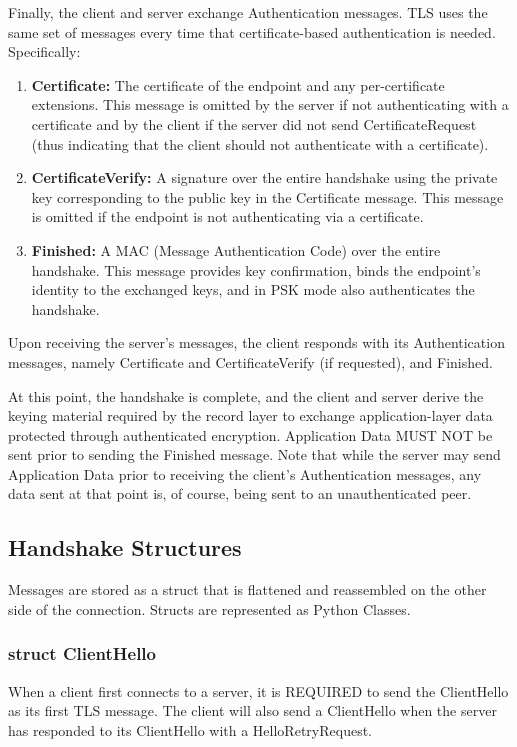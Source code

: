 \documentclass{article}
\begin{document}
   Finally, the client and server exchange Authentication messages.  TLS
   uses the same set of messages every time that certificate-based
   authentication is needed. Specifically:
\begin{enumerate}
    \item \textbf{Certificate:}  The certificate of the endpoint and any per-certificate
      extensions.  This message is omitted by the server if not
      authenticating with a certificate and by the client if the server
      did not send CertificateRequest (thus indicating that the client
      should not authenticate with a certificate).
    \item \textbf{CertificateVerify:}  A signature over the entire handshake using the
      private key corresponding to the public key in the Certificate
      message.  This message is omitted if the endpoint is not
      authenticating via a certificate.
    \item  \textbf{Finished:}  A MAC (Message Authentication Code) over the entire
      handshake.  This message provides key confirmation, binds the
      endpoint's identity to the exchanged keys, and in PSK mode also
      authenticates the handshake.
\end{enumerate}

   Upon receiving the server's messages, the client responds with its
   Authentication messages, namely Certificate and CertificateVerify (if
   requested), and Finished.

   At this point, the handshake is complete, and the client and server
   derive the keying material required by the record layer to exchange
   application-layer data protected through authenticated encryption.
   Application Data MUST NOT be sent prior to sending the Finished
   message.  Note that while the server may send Application Data prior
   to receiving the client's Authentication messages, any data sent
   at that point is, of course, being sent to an unauthenticated peer.


\subsection{Handshake Structures}
Messages are stored as a struct that is flattened and reassembled on the other side of the connection. Structs are represented as Python Classes.
\subsubsection{struct ClientHello}
When a client first connects to a server, it is REQUIRED to send the
   ClientHello as its first TLS message.  The client will also send a
   ClientHello when the server has responded to its ClientHello with a
   HelloRetryRequest.
\end{document}
